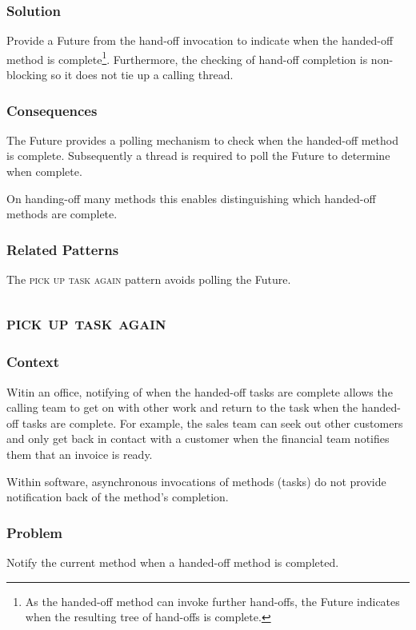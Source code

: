 \documentclass[prodmode]{style/acmlarge}
\begin{document}
\subsubsection*{\textbf{Solution}} Provide a Future from the hand-off invocation to
indicate when the handed-off method is complete\footnote{As the handed-off
method can invoke further hand-offs, the Future indicates when the resulting
tree of hand-offs is complete.}.  Furthermore, the checking of hand-off
completion is non-blocking so it does not tie up a calling thread.

\subsubsection*{Consequences} The Future provides a polling mechanism to check
when the handed-off method is complete.  Subsequently a thread is required to
poll the Future to determine when complete.

On handing-off many methods this enables distinguishing which handed-off methods
are complete.

\subsubsection*{Related Patterns} The \textsc{pick up task again} pattern avoids
polling the Future.



\subsection{\textsc{\textbf{pick up task again}}}

\subsubsection*{Context} Witin an office, notifying of when the handed-off tasks
are complete allows the calling team to get on with other work and return to the
task when the handed-off tasks are complete.  For example, the sales team can
seek out other customers and only get back in contact with a customer when the
financial team notifies them that an invoice is ready.

Within software, asynchronous invocations of methods (tasks) do not provide
notification back of the method's completion.

\subsubsection*{\textbf{Problem}} Notify the current method when a handed-off method is
completed.
\end{document}
